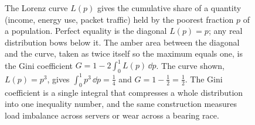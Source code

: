 \begin{figure}[htbp]
\centering
{}
\caption[Lorenz curve and the Gini coefficient]{The Lorenz curve $L(p)$
gives the cumulative share of a quantity (income, energy use, packet
traffic) held by the poorest fraction $p$ of a population. Perfect
equality is the diagonal $L(p)=p$; any real distribution bows below it.
The amber area between the diagonal and the curve, taken as twice itself
so the maximum equals one, is the Gini coefficient $G = 1 - 2\int_0^1
L(p)\,\dd p$. The curve shown, $L(p)=p^3$, gives $\int_0^1 p^3\,\dd p =
\tfrac14$ and $G = 1 - \tfrac12 = \tfrac12$. The Gini coefficient is a
single integral that compresses a whole distribution into one inequality
number, and the same construction measures load imbalance across servers
or wear across a bearing race.}
\label{fig:vol02ch06:lorenz-gini}
\end{figure}
